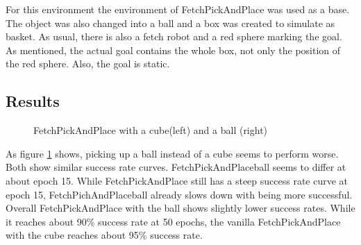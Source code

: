 For this environment the environment of FetchPickAndPlace was used as a base. The object was also changed into a ball and a box was created to simulate as basket. As usual, there is also a fetch robot and a red sphere marking the goal. As mentioned, the actual goal contains the whole box, not only the position of the red sphere. Also, the goal is static.

\subsection{Results}

\begin{figure} [!ht]
	
	\centering
	\caption{FetchPickAndPlace with a cube(left) and a ball (right)}
	\label{pickballcube}
	
\end{figure}

As figure \ref{pickballcube} shows, picking up a ball instead of a cube seems to perform worse. Both show similar success rate curves. FetchPickAndPlaceball seems to differ at about epoch 15. While FetchPickAndPlace still has a steep success rate curve at epoch 15, FetchPichAndPlaceball already slows down with being more successful. Overall FetchPickAndPlace with the ball shows slightly lower success rates. While it reaches about 90\% success rate at 50 epochs, the vanilla FetchPickAndPlace with the cube reaches about 95\% success rate.

